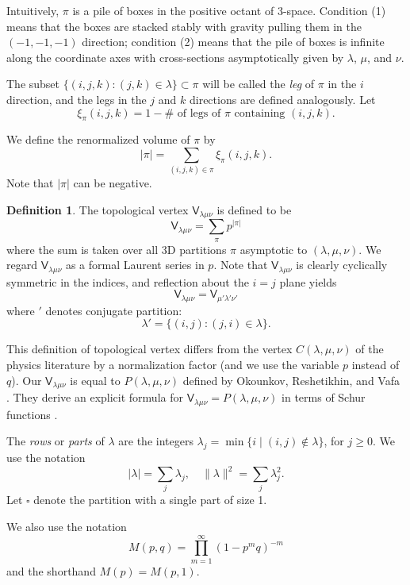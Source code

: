\documentclass[12pt]{amsart}
\newcommand{\Vsf}{\mathsf{V}}
\newcommand{\bx}{\square}
\theoremstyle{definition}
\newtheorem{defn}[theorem]{Definition}
\begin{document}
Intuitively, $\pi $ is a pile of boxes in the positive octant of
3-space.  Condition (1) means that the boxes are stacked stably with
gravity pulling them in the $(-1,-1,-1)$ direction; condition (2)
means that the pile of boxes is infinite along the coordinate axes
with cross-sections asymptotically given by $\lambda $, $\mu $, and
$\nu $.

The subset $\{(i,j,k ): (j,k)\in \lambda \}\subset \pi $ will be
called the \emph{leg} of $\pi $ in the $i$ direction, and the legs in
the $j$ and $k$ directions are defined analogously. Let
\begin{equation*}
\xi _{\pi } (i,j,k) = 1 - \# \text{ of legs of $\pi $ containing }
(i,j,k) .
\end{equation*}

We define the renormalized volume of $\pi $ by
\[
|\pi | = \sum _{(i,j,k)\in \pi } \xi _{\pi } (i,j,k).
\]
Note that $|\pi |$ can be negative.
\begin{defn}\label{defn: box counting vertex}
The topological vertex $\Vsf_{\lambda \mu \nu }$ is defined to be
\[
\Vsf _{\lambda \mu \nu }= \sum _{\pi } p^{|\pi |}
\]
where the sum is taken over all 3D partitions $\pi $ asymptotic to
$(\lambda ,\mu ,\nu )$. We regard $\Vsf _{\lambda \mu \nu }$ as a
formal Laurent series in $p$. Note that $\Vsf _{\lambda \mu \nu }$ is
clearly cyclically symmetric in the indices, and reflection about the
$i=j$ plane yields
\[
\Vsf _{\lambda \mu \nu } = \Vsf _{\mu '\lambda '\nu '}
\]
where $'$ denotes conjugate partition:
\[
\lambda ' = \{(i,j): (j,i)\in \lambda  \}.
\]

\end{defn}
This definition of topological vertex differs from the vertex $C
(\lambda ,\mu ,\nu )$ of the physics literature by a normalization
factor (and we use the variable $p$ instead of $q$). Our $\Vsf
_{\lambda \mu \nu }$ is equal to $P (\lambda ,\mu ,\nu )$ defined by
Okounkov, Reshetikhin, and Vafa \cite[eqn~3.16]{Ok-Re-Va}. They derive
an explicit formula for $\Vsf _{\lambda \mu \nu }=P (\lambda, \mu, \nu
)$ in terms of Schur functions \cite[eqns~3.20 and 3.21]{Ok-Re-Va}.



The \emph{rows} or \emph{parts} of $\lambda $
are the integers $\lambda _j = \min \{i \;|\;(i,j) \not \in \lambda
\}$, for $j \geq 0$. We use the notation
\[
|\lambda | = \sum_{j} \lambda_{j},\quad \| \lambda \| ^{2} =\sum_{j}\lambda_{j}^{2}.
\]
Let $\bx$ denote the partition with a single part of size 1.

We also use the notation
\[
M(p,q) = \prod_{m=1}^{\infty} (1-p^{m}q)^{-m}
\]
and the shorthand $M(p)=M(p,1)$.
\end{document}

